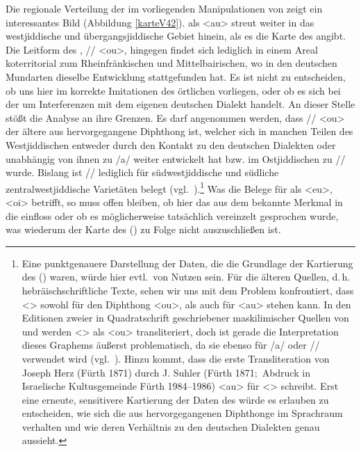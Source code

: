 Die regionale Verteilung der im  vorliegenden Manipulationen von  zeigt ein interessantes Bild (Abbildung \ref{karteV42}).  als <au> streut weiter in das westjiddische und übergangsjiddische Gebiet hinein, als es die Karte des  \cite[79]{Herzog1992} angibt. Die Leitform des ,  /\textopeno {}/ <ou>, hingegen findet sich lediglich in einem Areal koterritorial zum Rheinfränkischen und Mittelbairischen, wo in den deutschen Mundarten dieselbe Entwicklung stattgefunden hat. Es ist nicht zu entscheiden, ob uns hier im  korrekte Imitationen des örtlichen \hai{{\WJ}} vorliegen, oder ob es sich bei der  um Interferenzen mit dem eigenen deutschen Dialekt handelt. An dieser Stelle stößt die Analyse an ihre Grenzen. Es darf angenommen werden, dass /\textopeno {}/ <ou> der ältere aus  hervorgegangene Diphthong ist, welcher sich in manchen Teilen des Westjiddischen entweder durch den Kontakt zu den deutschen Dialekten oder unabhängig von ihnen zu /a/ weiter entwickelt hat bzw. im Ostjiddischen zu /\textopeno {}/ wurde. Bislang ist /\textopeno {}/ lediglich für südwestjiddische und südliche zentralwestjiddische Varietäten belegt (vgl.\, \citealt[58f]{GuggenheimGruenberg1973}).\footnote{Eine punktgenauere Darstellung der Daten, die die Grundlage der Kartierung des  (\citeyear[79]{Herzog1992}) waren, würde hier evtl.\, von Nutzen sein. Für die älteren Quellen, d.\,h. hebräischschriftliche Texte, sehen wir uns mit dem Problem konfrontiert, dass <> sowohl für den Diphthong <ou>, als auch für <au> stehen kann. In den Editionen zweier in Quadratschrift geschriebener maskilimischer Quellen von \cite{AptrootGruschka2004} und \cite{copeland1976} werden <> als <ou> transliteriert, doch ist gerade die Interpretation dieses Graphems äußerst problematisch, da sie ebenso für /a/ oder  /\textopeno \textsubarch{\textsci}/ verwendet wird  (vgl.\, \citealt[167]{Timm1987}). Hinzu kommt, dass die erste Transliteration von Joseph Herz  (Fürth 1871) durch J. Suhler (Fürth 1871;\, Abdruck in Israelische Kultusgemeinde Fürth 1984–1986) <au> für <> schreibt. Erst eine erneute, sensitivere Kartierung der Daten des  würde es erlauben zu entscheiden, wie sich die aus  hervorgegangenen Diphthonge im \hai{{\WJ}} Sprachraum verhalten und wie deren Verhältnis zu den deutschen Dialekten genau aussieht.} Was die Belege für  als <eu>, <oi> betrifft, so muss offen bleiben, ob hier das aus dem \hai{{\OJ}} bekannte Merkmal in die  einfloss oder ob es möglicherweise tatsächlich vereinzelt gesprochen wurde, was wiederum der Karte des  (\citealt[79]{Herzog1992}) zu Folge nicht auszuschließen ist.
 
